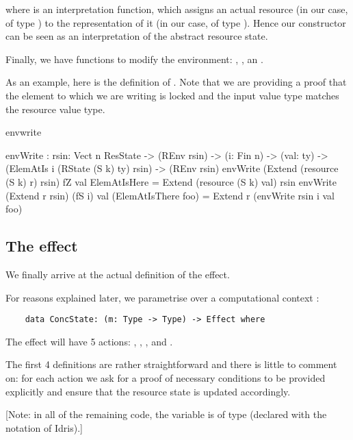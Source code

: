 where  is an interpretation function, which assigns an actual resource
(in our case, of type ) to the representation of it (in our
case, of type ). Hence our  constructor can be
seen as an interpretation of the abstract resource state.

Finally, we have functions to modify the environment: ,
,  an .

As an example, here is the definition of . Note that we are
providing a proof that the element to which we are writing is locked and the
input value type matches the resource value type.

\begin{SaveVerbatim}{envwrite}

    envWrite : {rsin: Vect n ResState} -> (REnv rsin) ->
                    (i: Fin n) -> (val: ty) ->
                    (ElemAtIs i (RState (S k) ty) rsin) ->
                    (REnv rsin)
    envWrite (Extend (resource (S k) r) rsin) fZ val ElemAtIsHere =
        Extend (resource (S k) val) rsin
    envWrite (Extend r rsin) (fS i) val (ElemAtIsThere foo) =
        Extend r (envWrite rsin i val foo)

\end{SaveVerbatim}

\subsection{The effect}

We finally arrive at the actual definition of the  effect.

For reasons explained later, we parametrise  over a
computational context :

\begin{verbatim}
    data ConcState: (m: Type -> Type) -> Effect where
\end{verbatim}

The effect will have 5 actions: , , ,
 and .

The first 4 definitions are rather straightforward and there is little to
comment on: for each action we ask for a proof of necessary conditions to be
provided explicitly and ensure that the resource state is updated accordingly.

[Note: in all of the remaining code, the variable  is of type
 (declared with the  notation of Idris).]

